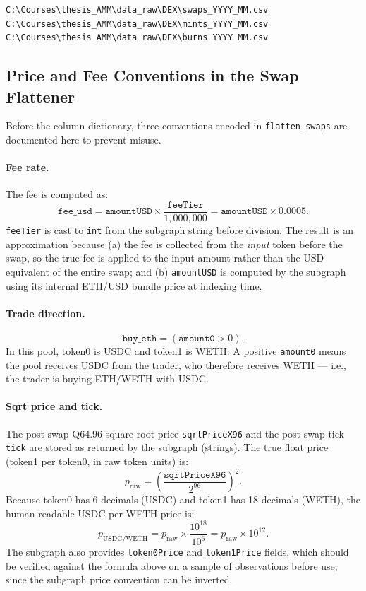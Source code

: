 \documentclass[11pt,a4paper]{article}
\begin{document}
\begin{lstlisting}
C:\Courses\thesis_AMM\data_raw\DEX\swaps_YYYY_MM.csv
C:\Courses\thesis_AMM\data_raw\DEX\mints_YYYY_MM.csv
C:\Courses\thesis_AMM\data_raw\DEX\burns_YYYY_MM.csv
\end{lstlisting}

\subsection{Price and Fee Conventions in the Swap Flattener}

Before the column dictionary, three conventions encoded in
\texttt{flatten\_swaps} are documented here to prevent misuse.

\paragraph{Fee rate.}
The fee is computed as:
\[
  \texttt{fee\_usd} = \texttt{amountUSD} \times \frac{\texttt{feeTier}}{1{,}000{,}000}
  = \texttt{amountUSD} \times 0.0005.
\]
\texttt{feeTier} is cast to \texttt{int} from the subgraph string before
division. The result is an approximation because (a) the fee is collected
from the \emph{input} token before the swap, so the true fee is applied to
the input amount rather than the USD-equivalent of the entire swap; and
(b) \texttt{amountUSD} is computed by the subgraph using its internal
ETH/USD bundle price at indexing time.

\paragraph{Trade direction.}
\[
  \texttt{buy\_eth} = (\texttt{amount0} > 0).
\]
In this pool, token0 is USDC and token1 is WETH. A positive \texttt{amount0}
means the pool receives USDC from the trader, who therefore receives WETH ---
i.e., the trader is buying ETH/WETH with USDC.

\paragraph{Sqrt price and tick.}
The post-swap Q64.96 square-root price \texttt{sqrtPriceX96} and the
post-swap tick \texttt{tick} are stored as returned by the subgraph
(strings). The true float price (token1 per token0, in raw token units) is:
\[
  p_{\mathrm{raw}} = \left(\frac{\texttt{sqrtPriceX96}}{2^{96}}\right)^{2}.
\]
Because token0 has 6 decimals (USDC) and token1 has 18 decimals (WETH), the
human-readable USDC-per-WETH price is:
\[
  p_{\mathrm{USDC/WETH}} = p_{\mathrm{raw}} \times \frac{10^{18}}{10^{6}}
  = p_{\mathrm{raw}} \times 10^{12}.
\]
The subgraph also provides \texttt{token0Price} and \texttt{token1Price}
fields, which should be verified against the formula above on a sample of
observations before use, since the subgraph price convention can be inverted.
\end{document}
